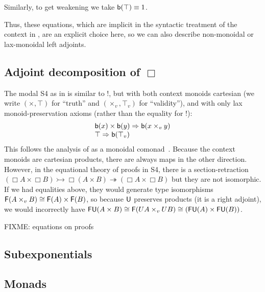 Similarly, to get weakening we take $\mathsf{b}(\top) \equiv 1$.  

Thus, these equations, which are implicit in the syntactic treatment of
the context in \citep{bentonwadler96adjoint,reed09adjoint}, are an
explicit choice here, so we can also describe non-monoidal or
lax-monoidal left adjoints.

\subsection{Adjoint decomposition of $\Box$}  

The modal S4 \Bx{}{} as in \citet{pfenningdavies} is similar to !, but
with both context monoids cartesian (we write $(\times,\top)$ for
``truth'' and $(\times_v,\top_v)$ for ``validity''), and with only lax
monoid-preservation axioms (rather than the equality for $!$):
\[
\begin{array}{l}
\mathsf{b}(x) \times \mathsf{b}(y) \Rightarrow \mathsf{b}(x \times_v y) \\
\top \Rightarrow \mathsf{b}(\top_v)
\end{array}
\]
This follows the analysis of \Bx{}{} as a monoidal
comonad~\citep{alechina+01categoricals4}.  Because the context monoids
are cartesian products, there are always maps in the other direction.
However, in the equational theory of proofs in S4, there is a
section-retraction $(\Box A \times \Box B) \rightarrowtail \Box (A
\times B) \twoheadrightarrow (\Box A \times \Box B)$ but they are not
isomorphic. If we had equalities above, they would generate type
isomorphisms $\mathsf{F}(A \times_v B) \cong \mathsf{F}(A) \times \mathsf{F}(B)$,
so because $\mathsf{U}$ preserves products (it is a right adjoint), we
would incorrectly have $\mathsf{F} \mathsf{U} (A \times B) \cong \mathsf{F}(U A
\times_v U B) \cong (\mathsf{FU}(A) \times \mathsf{FU}(B))$.

FIXME: equations on proofs

\subsection{Subexponentials}

\subsection{Monads}


